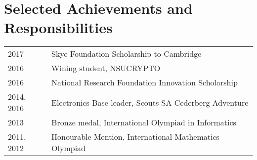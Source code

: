 \section{Selected Achievements and Responsibilities}
\begin{tabular}{R{3cm}|l}
2017 & Skye Foundation Scholarship to Cambridge\\
2016 & Wining student, NSUCRYPTO\\
2016 & National Research Foundation Innovation Scholarship\\
2014, 2016 & Electronics Base leader, Scouts SA Cederberg Adventure\\
2013 & Bronze medal, International Olympiad in Informatics\\
2011, 2012 & Honourable Mention, International Mathematics Olympiad\\
\end{tabular}
